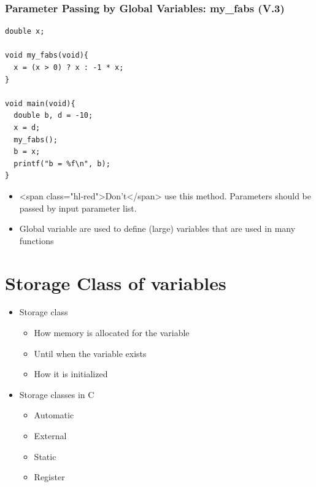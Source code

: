 \documentclass{../c-lecture}
\begin{document}
\begin{frame}[fragile]
  \frametitle{Parameter Passing by Global Variables: my\_fabs (V.3)}
  \begin{verbatim}
double x;

void my_fabs(void){
  x = (x > 0) ? x : -1 * x;
}

void main(void){
  double b, d = -10;
  x = d;
  my_fabs();
  b = x;
  printf("b = %f\n", b);
}
  \end{verbatim}
\end{frame}
\begin{frame}
  \begin{itemize}
    \item
      <span class="hl-red">Don’t</span> use this method. Parameters should be
      passed by input parameter list.

    \item
      Global variable are used to define (large) variables that are used in
      many functions

  \end{itemize}
\end{frame}

\section{Storage Class of variables}

\begin{frame}
  \begin{itemize}
    \item Storage class
    \begin{itemize}
      \item How memory is allocated for the variable
      \item Until when the variable exists
      \item How it is initialized
    \end{itemize}
    \item Storage classes in C
    \begin{itemize}
      \item Automatic
      \item External
      \item Static
      \item Register
    \end{itemize}
  \end{itemize}
\end{frame}
\end{document}
